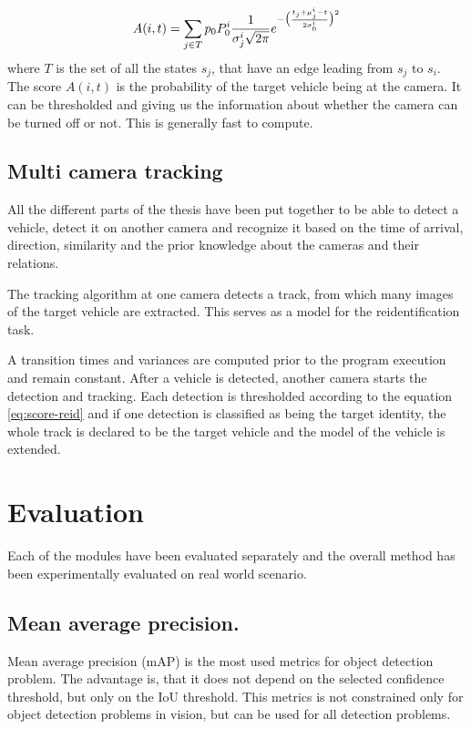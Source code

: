 \documentclass[a4paper,12pt,titlepage, twoside]{article}
\numberwithin{figure}{section}
\begin{document}
\begin{equation}
A(i, t) = \sum_{j \in T}p_0 P_0^i \frac{1}{\sigma_j^i \sqrt{2\pi}}e^{-\big{(}\frac{t_j + \mu_j^i - t}{2\sigma_0^i}\big{)}^2}
\end{equation}
where $T$ is the set of all the states $s_j$, that have an edge leading from $s_j$ to $s_i$. The score $A(i, t)$ is the probability of the target vehicle being at the camera. It can be thresholded and giving us the information about whether the camera can be turned off or not.
This is generally fast to compute.


\subsection{Multi camera tracking}

All the different parts of the thesis have been put together to be able to detect a vehicle, detect it on another camera and recognize it based on the time of arrival, direction, similarity and the prior knowledge about the cameras and their relations. 

The tracking algorithm at one camera detects a track, from which many images of the target vehicle are extracted. This serves as a model for the reidentification task. 

A transition times and variances are computed prior to the program execution and remain constant. After a vehicle is detected, another camera starts the detection and tracking. Each detection is thresholded according to the equation \ref{eq:score-reid} and if one detection is classified as being the target identity, the whole track is declared to be the target vehicle and the model of the vehicle is extended.

\clearpage
\section{Evaluation}
Each of the modules have been evaluated separately and the overall method has been experimentally evaluated on real world scenario.

\subsection{Mean average precision.}
\label{sec:mAP}
Mean average precision (mAP) is the most used metrics for object detection problem. The advantage is, that it does not depend on the selected confidence threshold, but only on the IoU threshold. This metrics is not constrained only for object detection problems in vision, but can be used for all detection problems. 
\end{document}
